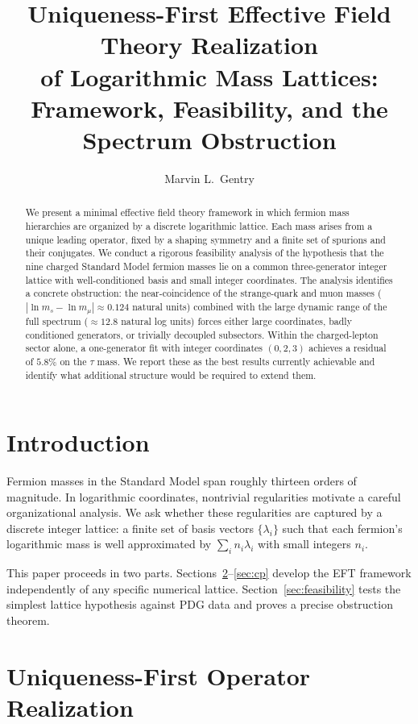 ﻿\documentclass[11pt]{article}
\title{Uniqueness-First Effective Field Theory Realization\\
of Logarithmic Mass Lattices:\\
Framework, Feasibility, and the Spectrum Obstruction}
\author{Marvin L.\ Gentry}
\date{}
\begin{document}
\maketitle

\begin{abstract}
We present a minimal effective field theory framework in which fermion mass
hierarchies are organized by a discrete logarithmic lattice. Each mass
arises from a unique leading operator, fixed by a shaping symmetry and a
finite set of spurions and their conjugates. We conduct a rigorous
feasibility analysis of the hypothesis that the nine charged Standard Model
fermion masses lie on a common three-generator integer lattice with
well-conditioned basis and small integer coordinates. The analysis identifies
a concrete obstruction: the near-coincidence of the strange-quark and muon
masses ($|\ln m_s-\ln m_\mu|\approx0.124$ natural units) combined with the
large dynamic range of the full spectrum ($\approx12.8$ natural log units)
forces either large coordinates, badly conditioned generators, or trivially
decoupled subsectors. Within the charged-lepton sector alone, a
one-generator fit with integer coordinates $(0,2,3)$ achieves a residual
of $5.8\%$ on the $\tau$ mass. We report these as the best results
currently achievable and identify what additional structure would be
required to extend them.
\end{abstract}

\section{Introduction}

Fermion masses in the Standard Model span roughly thirteen orders of
magnitude. In logarithmic coordinates, nontrivial regularities motivate a
careful organizational analysis. We ask whether these regularities are
captured by a discrete integer lattice: a finite set of basis vectors
$\{\lambda_i\}$ such that each fermion's logarithmic mass is well
approximated by $\sum_i n_i\lambda_i$ with small integers $n_i$.

This paper proceeds in two parts. Sections~\ref{sec:eft}--\ref{sec:cp}
develop the EFT framework independently of any specific numerical lattice.
Section~\ref{sec:feasibility} tests the simplest lattice hypothesis against
PDG data and proves a precise obstruction theorem.

\section{Uniqueness-First Operator Realization}
\label{sec:eft}
\end{document}
